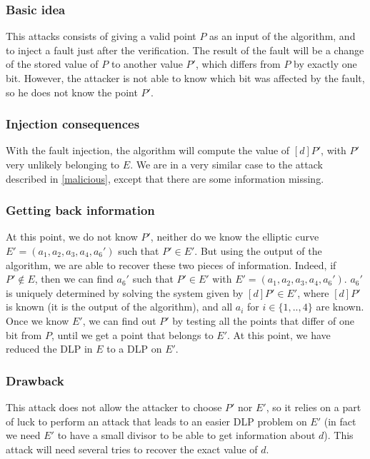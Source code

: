 \documentclass[journal]{IEEEtran}
\begin{document}
\subsubsection{Basic idea}
This attacks consists of giving a valid point $P$ as an input of the algorithm, and to 
inject a fault just after the verification. The result of the fault will be a change of the
stored value of $P$ to another value $P'$, which differs from $P$ by exactly one bit. 
However, the attacker is not able to know which bit was affected by the fault, so he 
does not know the point $P'$. \\

\subsubsection{Injection consequences}
With the fault injection, the algorithm will compute the value of $[d]P'$, with $P'$ very unlikely
belonging to $E$. We are in a very similar case to the attack described in \ref{malicious}, except that
there are some information missing. \\

\subsubsection{Getting back information}
At this point, we do not know $P'$, neither do we know the elliptic curve $E' = (a_1, a_2, a_3, a_4, a_6')$
such that $P' \in E'$. But using the output of the algorithm, we are able to recover these two pieces of information.
Indeed, if $P' \notin E$, then we can find $a_6'$ such that $P' \in E'$ with $E' = (a_1, a_2, a_3, a_4, a_6')$. $a_6'$ is uniquely determined by solving
the system given by $[d]P' \in E'$, where $[d]P'$ is known (it is the output of the algorithm), 
and all $a_i$ for $i \in \{1, .., 4\}$ are known. 
Once we know $E'$, we can find out $P'$ by testing all the points that differ of one bit from $P$, until we get a point that belongs to $E'$.
At this point, we have reduced the DLP in $E$ to a DLP on $E'$. \\

\subsubsection{Drawback}
This attack does not allow the attacker to choose $P'$ nor $E'$, so it relies on a part of luck to perform an attack
that leads to an easier DLP problem on $E'$ (in fact we need $E'$ to have a small divisor to be able to
get information about $d$). This attack will need several tries to recover the exact value of $d$.
\end{document}
